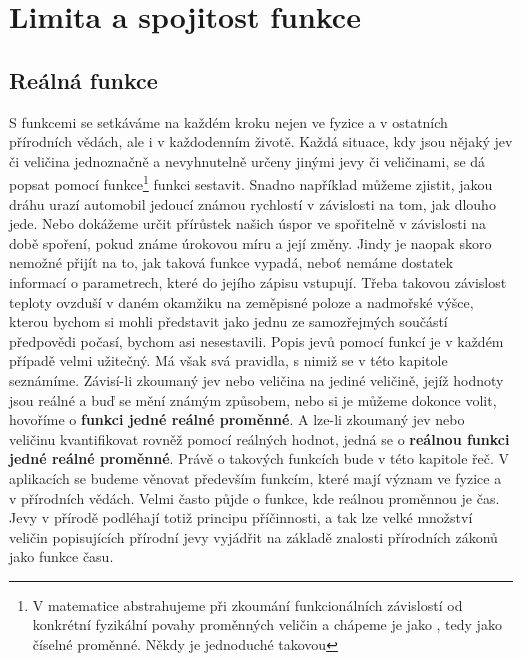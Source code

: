 \chapter{Limita a spojitost funkce}\label{mai:IchapIII}
\minitoc

  \section{Reálná funkce}
    \small
    S funkcemi se setkáváme na každém kroku nejen ve fyzice a v ostatních přírodních vědách, ale i 
    v každodenním životě. Každá situace, kdy jsou nějaký jev či veličina jednoznačně a nevyhnutelně 
    určeny jinými jevy či veličinami, se dá popsat pomocí funkce\footnote{V matematice abstrahujeme 
    při zkoumání funkcionálních závislostí od konkrétní fyzikální povahy proměnných veličin a 
    chápeme je jako , tedy jako číselné proměnné. Někdy je jednoduché 
    takovou} funkci sestavit. Snadno například můžeme zjistit, jakou dráhu urazí automobil jedoucí 
    známou rychlostí v závislosti na tom, jak dlouho jede. Nebo dokážeme určit přírůstek našich 
    úspor ve spořitelně v závislosti na době spoření, pokud známe úrokovou míru a její změny. Jindy 
    je naopak skoro nemožné přijít na to, jak taková funkce vypadá, neboť nemáme dostatek informací 
    o parametrech, které do jejího zápisu vstupují. Třeba takovou závislost teploty ovzduší v daném 
    okamžiku na zeměpisné poloze a nadmořské výšce, kterou bychom si mohli představit jako jednu ze 
    samozřejmých součástí předpovědi počasí, bychom asi nesestavili. Popis jevů pomocí funkcí je v 
    každém případě velmi užitečný. Má však svá pravidla, s nimiž se v této kapitole seznámíme. 
    Závisí-li zkoumaný jev nebo veličina na jediné veličině, jejíž hodnoty jsou reálné a buď se 
    mění známým způsobem, nebo si je můžeme dokonce volit, hovoříme o \textbf{funkci jedné reálné 
    proměnné}. A lze-li zkoumaný jev nebo veličinu kvantifikovat rovněž pomocí reálných hodnot, 
    jedná se o \textbf{reálnou funkci jedné reálné proměnné}. Právě o takových funkcích bude v této 
    kapitole řeč. V aplikacích se budeme věnovat především funkcím, které mají význam ve fyzice a v 
    přírodních vědách. Velmi často půjde o funkce, kde reálnou proměnnou je čas. Jevy v přírodě 
    podléhají totiž principu příčinnosti, a tak lze velké množství veličin popisujících přírodní 
    jevy vyjádřit na základě znalosti přírodních zákonů jako funkce času. 
    \cite[s.~53]{Musilova2009MA1}
    \normalsize
